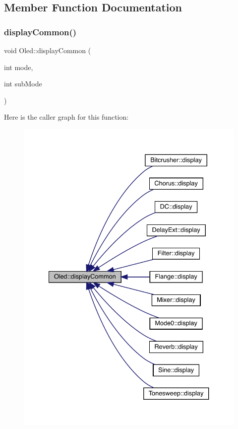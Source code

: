 \begin{DoxyItemize}
\item 
\end{DoxyItemize}

\subsection{Member Function Documentation}
\mbox{\label{class_oled_a466ecce521b09ac6470aae9836b2f806}} 
\subsubsection{\texorpdfstring{display\+Common()}{displayCommon()}}
{\footnotesize\ttfamily void Oled\+::display\+Common (\begin{DoxyParamCaption}\item[{int}]{mode,  }\item[{int}]{sub\+Mode }\end{DoxyParamCaption})}

Here is the caller graph for this function\+:\nopagebreak
\begin{figure}[H]
\begin{center}
\leavevmode
\includegraphics[width=334pt]{class_oled_a466ecce521b09ac6470aae9836b2f806_icgraph}
\end{center}
\end{figure}
\mbox{\label{class_oled_a36f0818a7144c6983ae765a7a0659a70}} 

